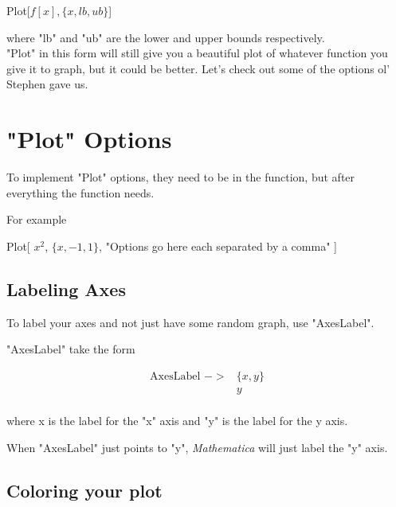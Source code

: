 \documentclass[11pt,letterpaper,twoside,titlepage]{report}
\newcommand{\Mathematica}{\textit{Mathematica} }
\begin{document}
				\begin{center}
			
					Plot[$ f[x],  \{ x, lb, ub \} $]
				
				\end{center}
				where "lb" and "ub" are the lower and upper bounds respectively. \\
				
				"Plot" in this form will still give you a beautiful plot of whatever function you give it to graph, but it could be better.  Let's check out some of the options ol' Stephen gave us.
				
			\section{"Plot" Options}
			
				To implement "Plot" options, they need to be in the function, but after everything the function needs.
				
				For example
				
				\begin{center}
				
					Plot[ $ x^2 $, $ \{ x,-1,1 \} $, "Options go here each separated by a comma" ]
				
				\end{center}
			
				\subsection{Labeling Axes}
					
					To label your axes and not just have some random graph, use "AxesLabel".
					
					"AxesLabel" take the form
					
					\begin{align*}
						\text{AxesLabel } ->& \{x,y\} \\
											& y \\
					\end{align*}
					
					where x is the label for the "x" axis and "y" is the label for the y axis.
						
					When "AxesLabel" just points to "y", \Mathematica will just label the "y" axis.
						
				\subsection{Coloring your plot}
						
\end{document}
